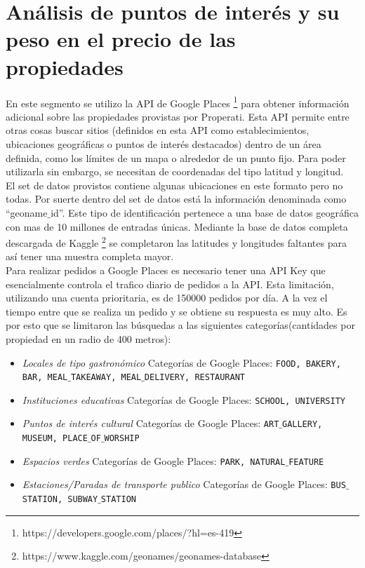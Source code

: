 \documentclass[a4paper, 10pt]{article}
\def\code#1{\texttt{#1}}
\begin{document}
		\part{Análisis de puntos de interés y su peso en el precio de las propiedades}
		En este segmento se utilizo la API de Google Places 
		\footnote{https://developers.google.com/places/?hl=es-419} para obtener información adicional 
		sobre las propiedades provistas por Properati. Esta API permite entre otras cosas buscar 
		sitios (definidos en esta API como establecimientos, ubicaciones geográficas o puntos de 
		interés destacados) dentro de un área definida, como los límites de un mapa o alrededor de 
		un punto fijo. Para poder utilizarla sin embargo, se necesitan de coordenadas del tipo 
		latitud y longitud.\\ 
		El set de datos provistos contiene algunas ubicaciones en este formato pero no todas. 
		Por suerte dentro del set de datos está la información denominada como “geoname$\_$id”. 
		Este tipo de identificación pertenece a una base de datos geográfica con mas de 10 
		millones de entradas únicas. 
		Mediante la base de datos completa descargada de Kaggle
		\footnote{https://www.kaggle.com/geonames/geonames-database} se completaron las 
		latitudes y longitudes faltantes para así tener una muestra completa mayor.\\
		Para realizar pedidos a Google Places es necesario tener una API Key que esencialmente 
		controla el trafico diario de pedidos a la API. Esta limitación, utilizando una cuenta 
		prioritaria, es de 150000 pedidos por día. A la vez el tiempo entre que se realiza un 
		pedido y se obtiene su respuesta es muy alto. Es por esto que se limitaron las búsquedas 
		a las siguientes categorías(cantidades por propiedad en un radio de 400 metros):
		
		\begin{itemize}
		\item \emph{Locales de tipo gastronómico}
			\subitem Categorías de Google Places: \code{FOOD, BAKERY, BAR, MEAL$\_$TAKEAWAY, MEAL$\_$DELIVERY, RESTAURANT}
		\item \emph{Instituciones educativas}
			\subitem Categorías de Google Places: \code{SCHOOL, UNIVERSITY}
		\item \emph{Puntos de interés cultural} 
			\subitem Categorías de Google Places: \code{ART$\_$GALLERY, MUSEUM, PLACE$\_$OF$\_$WORSHIP}
		\item \emph{Espacios verdes} 
			\subitem Categorías de Google Places: \code{PARK, NATURAL$\_$FEATURE}
		\item \emph{Estaciones/Paradas de transporte publico}
			\subitem Categorías de Google Places: \code{BUS$\_$STATION, SUBWAY$\_$STATION}			
		\end{itemize}
		
\end{document}
